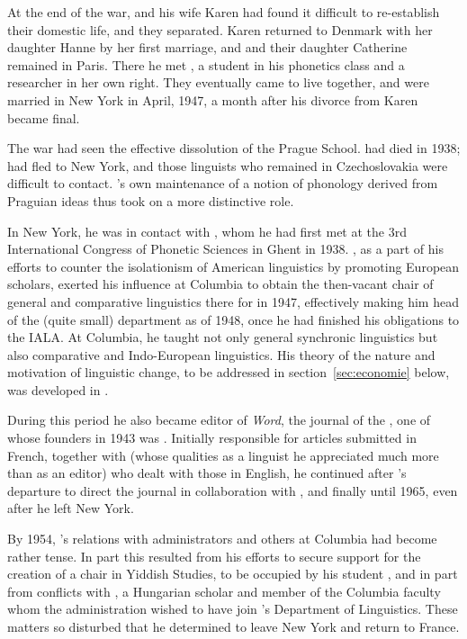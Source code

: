 At the end of the war, {\Martinet} and his wife 
Karen had found it
difficult to re-establish their domestic life, and they
separated. Karen returned to Denmark 
with her daughter Hanne by her
first marriage, and {\Martinet} and their daughter Catherine remained in
Paris.  There he met , a student in his phonetics class
and a researcher in her own right. They eventually came to live
together, and were married in New York in April, 1947, a month after
his divorce from Karen became final.

The war had seen the effective dissolution of the Prague
School. {\Trubetzkoy} had died in 1938; {\Jakobson} had fled to New York,
and those linguists who remained in Czechoslovakia were difficult to
contact.  {\Martinet}'s own maintenance of a notion of phonology derived
from Praguian ideas thus took on a more distinctive role.

In New York, he was in contact with {\Jakobson}, whom he had first met at
the 3rd International Congress of Phonetic Sciences in Ghent in 1938.
{\Jakobson}, as a part of his efforts to counter the isolationism of
American linguistics by promoting European scholars, exerted his
influence at Columbia to obtain the then-vacant chair of general and
comparative linguistics there for {\Martinet} in 1947, effectively making
him head of the (quite small) department as of 1948, once he had
finished his obligations to the IALA.  At Columbia, he taught not only
general synchronic linguistics but also comparative and {Indo-European}
linguistics. His theory of the nature and motivation of linguistic
change, to be addressed in section~\ref{sec:economie} below, was
developed in
\citealt{martinet52:function.structure,martinet55:economie}.

During this period he also became editor of \textsl{Word}, the journal
of the , one of whose founders in 1943
was {\Jakobson}. Initially responsible for articles submitted in {French},
together with  (whose qualities as a linguist he
appreciated much more than as an editor) who dealt with those in
{English}, he continued after {\Swadesh}'s departure to direct the journal
in collaboration with ,  and finally
 until 1965, even after he left New York.

By 1954, {\Martinet}'s relations with administrators and others at
Columbia had become rather tense. In part this resulted from his
efforts to secure support for the creation of a chair in Yiddish
Studies, to be occupied by his student , and in part
from conflicts with , a {Hungarian} scholar and member of the
Columbia faculty whom the administration wished to have join
{\Martinet}'s Department of Linguistics. These matters so disturbed
{\Martinet} that he determined to leave New York and return to France.

